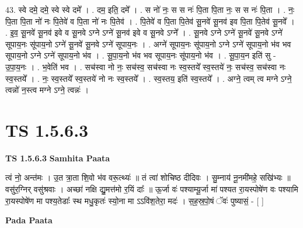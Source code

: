 \documentclass[17pt]{extarticle}
\begin{document}
43. स्वे दमे॒ दमे॒ स्वे स्वे दमे᳚ । . दम॒ इति॒ दमे᳚ । . स नो॑ नः॒ स स नः॑ पि॒ता पि॒ता नः॒ स स नः॑ पि॒ता । . नः॒ पि॒ता पि॒ता नो॑ नः पि॒तेवे॑ व पि॒ता नो॑ नः पि॒तेव॑ । . पि॒तेवे॑ व पि॒ता पि॒तेव॑ सू॒नवे॑ सू॒नव॑ इव पि॒ता पि॒तेव॑ सू॒नवे᳚ । . इ॒व॒ सू॒नवे॑ सू॒नव॑ इवे व सू॒नवे ऽग्ने ऽग्ने॑ सू॒नव॑ इवे व सू॒नवे ऽग्ने᳚ । . सू॒नवे ऽग्ने ऽग्ने॑ सू॒नवे॑ सू॒नवे ऽग्ने॑ सूपाय॒नः सू॑पाय॒नो ऽग्ने॑ सू॒नवे॑ सू॒नवे ऽग्ने॑ सूपाय॒नः । . अग्ने॑ सूपाय॒नः सू॑पाय॒नो ऽग्ने ऽग्ने॑ सूपाय॒नो भ॑व भव सूपाय॒नो ऽग्ने ऽग्ने॑ सूपाय॒नो भ॑व । . सू॒पा॒य॒नो भ॑व भव सूपाय॒नः सू॑पाय॒नो भ॑व । . सू॒पा॒य॒न इति॑ सु - उ॒पा॒य॒नः । . भ॒वेति॑ भव । . सच॑स्वा नो नः॒ सच॑स्व॒ सच॑स्वा नः स्व॒स्तये᳚ स्व॒स्तये॑ नः॒ सच॑स्व॒ सच॑स्वा नः स्व॒स्तये᳚ । . नः॒ स्व॒स्तये᳚ स्व॒स्तये॑ नो नः स्व॒स्तये᳚ । . स्व॒स्तय॒ इति॑ स्व॒स्तये᳚ । . अग्ने॒ त्वम् त्व मग्ने ऽग्ने॒ त्वन्नो॑ न॒स्त्व मग्ने ऽग्ने॒ त्वन्नः॑ । \newline
\pagebreak
{}
\section*{ TS 1.5.6.3 }

\textbf{TS 1.5.6.3 } \newline
\textbf{Samhita Paata} \newline

त्वं नो॒ अन्त॑मः । उ॒त त्रा॒ता शि॒वो भ॑व वरू॒त्थ्यः॑ ॥ तं त्वा॑ शोचिष्ठ दीदिवः । सु॒म्नाय॑ नू॒नमी॑महे॒ सखि॑भ्यः ॥ वसु॑र॒ग्निर् वसु॑श्रवाः । अच्छा॑ नक्षि द्यु॒मत्त॑मो र॒यिं दाः᳚ ॥ ऊ॒र्जा वः॑ पश्याम्यू॒र्जा मा॑ पश्यत रा॒यस्पोषे॑ण वः पश्यामि रा॒यस्पोषे॑ण मा पश्य॒तेडाः᳚ स्थ मधु॒कृतः॑ स्यो॒ना मा ऽऽवि॑श॒तेरा॒ मदः॑ । स॒ह॒स्र॒पो॒षं ॅवः॑ पुष्यासं॒ - [ ] \newline

\textbf{Pada Paata} \newline
\end{document}
